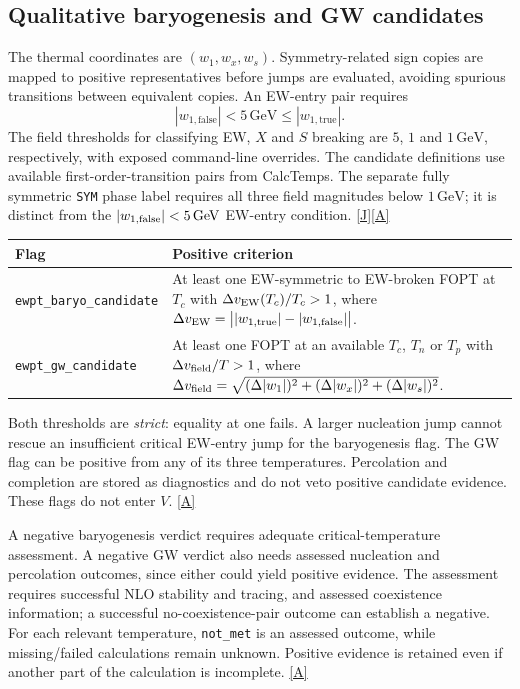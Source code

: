\documentclass[11pt,a4paper]{article}
\newcommand{\code}[1]{\ifmmode\mbox{\ttfamily\detokenize{#1}}\else\nolinkurl{#1}\fi}
\newcommand{\src}[1]{\hyperlink{src:#1}{\textsf{[#1]}}}
\newcommand{\GeV}{\,\mathrm{GeV}}
\begin{document}
\subsection{Qualitative baryogenesis and GW candidates}
The thermal coordinates are $(w_1,w_x,w_s)$. Symmetry-related sign copies
are mapped to positive representatives before jumps are evaluated, avoiding
spurious transitions between equivalent copies. An EW-entry pair requires
\begin{equation}
 |w_{1,\mathrm{false}}|<5\GeV\le|w_{1,\mathrm{true}}|.
\end{equation}
The field thresholds for classifying EW, $X$ and $S$ breaking are
$5$, $1$ and $1\GeV$, respectively, with exposed command-line overrides.
The candidate definitions use available first-order-transition pairs from
CalcTemps. The separate fully symmetric \code{SYM} phase label requires
all three field magnitudes below $1\GeV$; it is distinct from the
$|w_{1,\rm false}|<5\GeV$ EW-entry condition. \src{J}\src{A}

\begin{longtable}{@{}p{}p{}@{}}
\toprule
Flag & Positive criterion\\\midrule\endhead
\code{ewpt_baryo_candidate} & At least one EW-symmetric to EW-broken
FOPT at $T_c$ with
$\Delta v_{\rm EW}(T_c)/T_c>1$, where
$\Delta v_{\rm EW}=\bigl||w_{1,\rm true}|-|w_{1,\rm false}|\bigr|$.\\
\code{ewpt_gw_candidate} & At least one FOPT at an available
$T_c$, $T_n$ or $T_p$ with
$\Delta v_{\rm field}/T>1$, where
$\Delta v_{\rm field}=\sqrt{(\Delta|w_1|)^2+(\Delta|w_x|)^2+(\Delta|w_s|)^2}$.\\
\bottomrule
\end{longtable}
Both thresholds are \emph{strict}: equality at one fails. A larger
nucleation jump cannot rescue an insufficient critical EW-entry jump for
the baryogenesis flag. The GW flag can be positive from any of its three
temperatures. Percolation and completion are stored as diagnostics and do
not veto positive candidate evidence. These flags do not enter $V$.
\src{A}

A negative baryogenesis verdict requires adequate critical-temperature
assessment. A negative GW verdict also needs assessed nucleation and
percolation outcomes, since either could yield positive evidence.
The assessment requires successful NLO stability and tracing, and assessed
coexistence information; a successful no-coexistence-pair outcome can
establish a negative. For each relevant temperature, \code{not_met}
is an assessed outcome, while missing/failed calculations remain unknown.
Positive evidence is retained even if another part of the calculation is
incomplete. \src{A}
\end{document}
